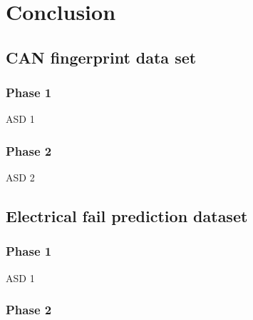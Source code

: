 \chapter{Conclusion}
\section{CAN fingerprint data set}
\subsection{Phase 1}
ASD 1


\subsection{Phase 2}
ASD 2
\section{Electrical fail prediction dataset}
\subsection{Phase 1}
ASD 1


\subsection{Phase 2}
